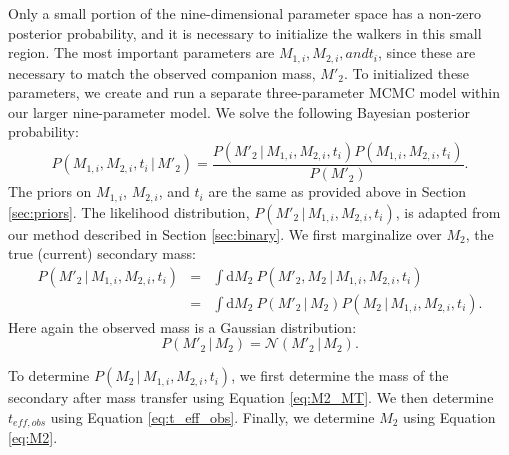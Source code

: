 \documentclass[12pt, preprint]{aastex}
\newcommand{\given}{\,|\,}
\newcommand{\dd}{\mathrm{d}}
\begin{document}
Only a small portion of the nine-dimensional parameter space has a non-zero posterior probability, and it is necessary to initialize the walkers in this small region. The most important parameters are $M_{1,i}, M_{2,i}, and t_i$, since these are necessary to match the observed companion mass, $M'_2$. To initialized these parameters, we create and run a separate three-parameter MCMC model within our larger nine-parameter model. We solve the following Bayesian posterior probability:
\begin{equation}
P(M_{1,i}, M_{2,i}, t_i \given M'_2) = \frac{ P(M'_2 \given M_{1,i}, M_{2,i}, t_i ) P( M_{1,i}, M_{2,i}, t_i )}{P(M'_2)}.
\end{equation}
The priors on $M_{1,i}$, $M_{2,i}$, and $t_i$ are the same as provided above in Section \ref{sec:priors}. The likelihood distribution, $P(M'_2 \given M_{1,i}, M_{2,i}, t_i )$, is adapted from our method described in Section \ref{sec:binary}. We first marginalize over $M_2$, the true (current) secondary mass:
\begin{eqnarray}
P(M'_2 \given M_{1,i}, M_{2,i}, t_i ) &=& \int \dd M_2\ P(M'_2, M_2 \given M_{1,i}, M_{2,i}, t_i ) \nonumber \\
&=& \int \dd M_2\ P(M'_2 \given M_2) P(M_2 \given M_{1,i}, M_{2,i}, t_i).
\end{eqnarray}
Here again the observed mass is a Gaussian distribution: 
\begin{equation}
P(M'_2 \given M_2) = \mathcal{N}(M'_2 \given M_2).
\end{equation}

To determine $P(M_2 \given M_{1,i}, M_{2,i}, t_i )$, we first determine the mass of the secondary after mass transfer using Equation \ref{eq:M2_MT}. We then determine $t_{eff,obs}$ using Equation \ref{eq:t_eff_obs}. Finally, we determine $M_2$ using Equation \ref{eq:M2}.
\end{document}
